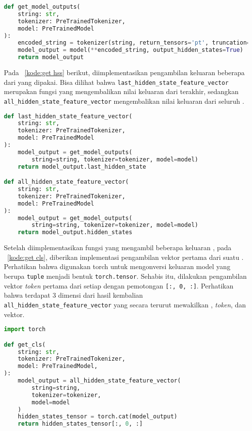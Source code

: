 \begin{lstlisting}[language=Python, caption={Fungsi mendapatkan keluaran dari \encoder{}}, label={kode:input encoder}]
def get_model_outputs(
    string: str,
    tokenizer: PreTrainedTokenizer,
    model: PreTrainedModel
):
    encoded_string = tokenizer(string, return_tensors='pt', truncation=True)
    model_output = model(**encoded_string, output_hidden_states=True)
    return model_output
\end{lstlisting}


Pada \kode{}~\ref{kode:get hss} berikut, diimplementasikan pengambilan keluaran beberapa  dari \encoder{} yang dipakai. Bisa dilihat bahwa \lstinline{last_hidden_state_feature_vector} merupakan fungsi yang mengembalikan nilai keluaran dari \hs{} terakhir, sedangkan \lstinline{all_hidden_state_feature_vector}  mengembalikan nilai keluaran dari seluruh .
\begin{lstlisting}[language=Python, caption={Fungsi pengambilan \hs{}}, label={kode:get hss}]
def last_hidden_state_feature_vector(
    string: str,
    tokenizer: PreTrainedTokenizer,
    model: PreTrainedModel
):
    model_output = get_model_outputs(
        string=string, tokenizer=tokenizer, model=model)
    return model_output.last_hidden_state

def all_hidden_state_feature_vector(
    string: str,
    tokenizer: PreTrainedTokenizer,
    model: PreTrainedModel
):
    model_output = get_model_outputs(
        string=string, tokenizer=tokenizer, model=model)
    return model_output.hidden_states
\end{lstlisting}


Setelah diimplementasikan fungsi yang mengambil beberapa keluaran , pada \kode{}~\ref{kode:get cls}, diberikan implementasi pengambilan vektor pertama dari suatu \hs{}. Perhatikan bahwa digunakan \library{} torch untuk mengonversi keluaran model yang berupa \lstinline{tuple} menjadi bentuk \lstinline{torch.tensor}. Sehabis itu, dilakukan pengambilan vektor \textit{token} pertama dari setiap  dengan pemotongan \lstinline{[:, 0, :]}. Perhatikan bahwa terdapat 3 dimensi dari hasil kembalian \lstinline{all_hidden_state_feature_vector} yang secara terurut mewakilkan \hs{}, \textit{token}, dan vektor.
\begin{lstlisting}[language=Python, caption={Pengambilan vektor pertama keluaran \hs{}}, label={kode:get cls}]
import torch

def get_cls(
    string: str,
    tokenizer: PreTrainedTokenizer,
    model: PreTrainedModel,
):
    model_output = all_hidden_state_feature_vector(
        string=string,
        tokenizer=tokenizer,
        model=model
    )
    hidden_states_tensor = torch.cat(model_output)
    return hidden_states_tensor[:, 0, :]
\end{lstlisting}





